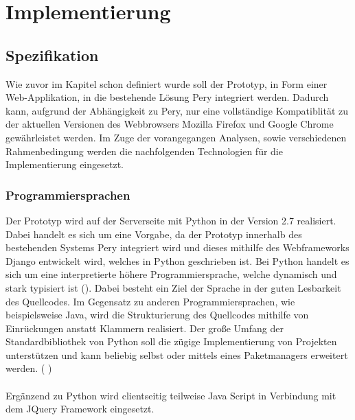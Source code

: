 \documentclass[Bachelorarbeit.tex]{subfiles}
\begin{document}
\chapter{Implementierung}
\label{chap:implementierung}

\section{Spezifikation}
\label{chap:implementierung:sec:spezifikation}
Wie zuvor im Kapitel  schon definiert wurde soll der Prototyp, in Form einer Web-Applikation, in die bestehende Lösung Pery integriert werden.
Dadurch kann, aufgrund der Abhängigkeit zu Pery, nur eine vollständige Kompatiblität zu der aktuellen Versionen des Webbrowsers Mozilla Firefox und Google Chrome gewährleistet werden.   
Im Zuge der vorangegangen Analysen, sowie verschiedenen Rahmenbedingung werden die nachfolgenden Technologien für die Implementierung eingesetzt. 

\subsection*{Programmiersprachen}
Der Prototyp wird auf der Serverseite mit Python in der Version 2.7 realisiert. 
Dabei handelt es sich um eine Vorgabe, da der Prototyp innerhalb des bestehenden Systems Pery integriert wird und dieses mithilfe des Webframeworks Django entwickelt wird, welches in Python geschrieben ist.
Bei Python handelt es sich um eine interpretierte höhere Programmiersprache, welche dynamisch und stark typisiert ist (\cite[vgl.][]{PythonTyped}).
Dabei besteht ein Ziel der Sprache in der guten Lesbarkeit des Quellcodes. 
Im Gegensatz zu anderen Programmiersprachen, wie beispielsweise Java, wird die Strukturierung des Quellcodes mithilfe von Einrückungen anstatt Klammern realisiert.
Der große Umfang der Standardbibliothek von Python soll die zügige Implementierung von Projekten unterstützen und kann beliebig selbst oder mittels eines Paketmanagers erweitert werden. (\cite[vgl.][]{PythonDoc} \cite[sowie ][- sekundär Quelle]{PythonStackoverflow})\\
\\
Ergänzend zu Python wird clientseitig teilweise Java Script in Verbindung mit dem JQuery Framework eingesetzt. 
\end{document}
